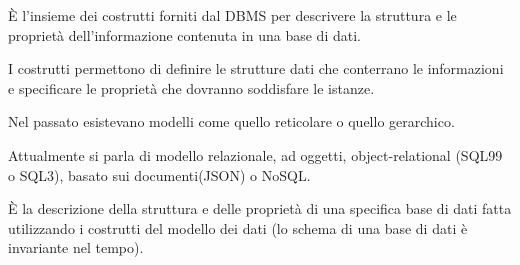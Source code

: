 \documentclass[a4paper, 12pt]{book}
\begin{document}
    



    \vspace{15pt}

    \begin{tcolorbox}[
      colback=cyan!5!white,
      colframe=blue!50!black,
      title=\textbf{Definizione - DBMS: modello dei dati},
      coltitle=white,
      fonttitle=\bfseries,
      arc=3mm,
      boxrule=0.5pt,
      enhanced,
      breakable
    ]
    È l’insieme dei costrutti forniti dal DBMS per descrivere la struttura e le proprietà dell’informazione contenuta in una base di dati.
    
    \vspace{1mm}
    
    I costrutti permettono di definire le strutture dati che conterrano le informazioni e specificare le proprietà che dovranno soddisfare le istanze.

    \end{tcolorbox}

    \vspace{15pt}



     Nel passato esistevano modelli come quello reticolare o quello gerarchico.

     Attualmente si parla di modello relazionale, ad oggetti, object-relational (SQL99 o SQL3), basato sui documenti(JSON) o NoSQL.



    \vspace{15pt}

    \begin{tcolorbox}[
      colback=cyan!5!white,
      colframe=blue!50!black,
      title=\textbf{Definizione - Schema di una base di dati},
      coltitle=white,
      fonttitle=\bfseries,
      arc=3mm,
      boxrule=0.5pt,
      enhanced,
      breakable
    ]
    È la descrizione della struttura e delle proprietà di una specifica base di dati fatta utilizzando i costrutti del modello dei dati (lo schema di una base di dati è invariante nel tempo).

    \end{tcolorbox}

    \vspace{15pt}

\end{document}

